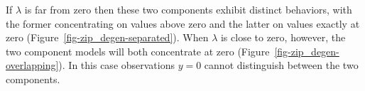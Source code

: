 \documentclass[
  letterpaper,
  DIV=11,
  numbers=noendperiod]{scrartcl}
\begin{document}
If \(\lambda\) is far from zero then these two components exhibit
distinct behaviors, with the former concentrating on values above zero
and the latter on values exactly at zero
(Figure~\ref{fig-zip_degen-separated}). When \(\lambda\) is close to
zero, however, the two component models will both concentrate at zero
(Figure~\ref{fig-zip_degen-overlapping}). In this case observations
\(y = 0\) cannot distinguish between the two components.

\begin{figure}

\begin{minipage}{0.05\linewidth}
~\end{minipage}%
%
\begin{minipage}{0.45\linewidth}


\subcaption{\label{fig-zip_degen-separated}}

\end{minipage}%
%
\begin{minipage}{0.45\linewidth}

\end{minipage}
\end{figure}
\end{document}

